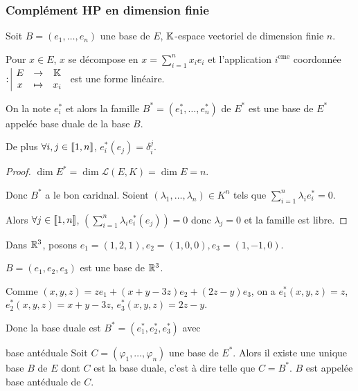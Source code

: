\subsubsection{Complément HP en dimension finie}

\begin{definition}{}{}

    Soit $B = (e_1, \dots, e_n)$ une base de $E$, $\mathbb{K}$-espace vectoriel de dimension finie $n$. 

    Pour $x\in E$, $x$ se décompose en $x = \sum_{i=1}^n x_i e_i$ et l'application $i^{\text{eme}}$ coordonnée
    $: \space \begin{array}{|ccc} \displaystyle E & \to & \displaystyle \mathbb{K} \\ \displaystyle x & \mapsto & \displaystyle x_i \end{array}$ est une forme linéaire. 

    On la note $e_i^*$ et alors la famille $B^* = (e_1^*, \dots, e_n^*)$ de $E^*$ est une base de $E^*$
    appelée base duale de la base $B$.

    De plus $\forall i, j \in [\![1, n]\!]$, $e_i^*(e_j) = \delta_i^j$.
\end{definition}

\begin{proof}
    $\dim E^* = \dim \mathscr L (E, K) = \dim E = n$. 

    Donc $B^*$ a le bon caridnal. Soient $(\lambda_1, \dots, \lambda_n) \in K^n$ tels que
    $\sum_{i=1}^n \lambda_i e_i^* = 0$.

    Alors $\forall j \in [\![1, n]\!]$, $\left( \sum_{i=1}^n \lambda_i e_i^*(e_j) \right) = 0$ donc
    $\lambda_j = 0$ et la famille est libre. 
    
\end{proof}

\begin{exemple}
    Dans $\mathbb{R}^3$, posons $e_1 = (1, 2, 1), e_2 = (1, 0, 0) , e_3 = (1, -1, 0)$.

    $B = (e_1, e_2, e_3)$ est une base de $\mathbb{R}^3$.

    Comme $(x, y, z ) = z e_1 + (x + y - 3z) e_2 + (2z - y) e_3$, on a
    $e_1^*(x, y, z) = z$, $e_2^*(x, y, z) = x + y - 3z$, $e_3^*(x, y, z) = 2z - y$.

    Donc la base duale est $B^* = (e_1^*, e_2^*, e_3^*)$ avec
\end{exemple}

\begin{theoreme}{base antéduale}{}
    Soit $C = (\varphi_1, \dots, \varphi_n)$ une base de $E^*$. Alors il existe une unique base $B$ de $E$ dont $C$
    est la base duale, c'est à dire telle que $C = B^*$. 
    $B$ est appelée base antéduale de $C$.
    
\end{theoreme}

